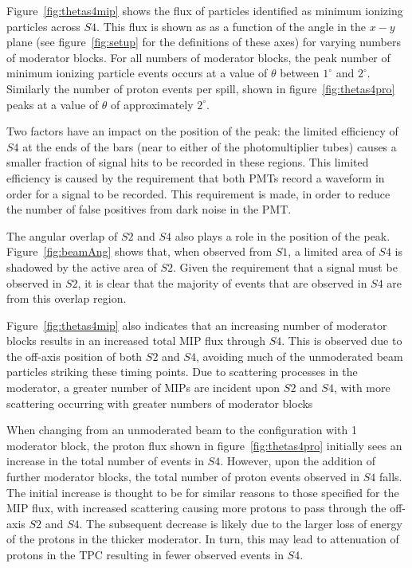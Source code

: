 	Figure~\ref{fig:thetas4mip} shows the flux of particles identified as minimum ionizing particles across $S4$.
	This flux is shown as as a function of the angle in the $x-y$ plane (see figure~\ref{fig:setup} for the definitions of these axes) for varying numbers of moderator blocks.
	For all numbers of moderator blocks, the peak number of minimum ionizing particle events occurs at a value of $\theta$ between $1^{\circ}$ and $2^{\circ}$.
	Similarly the number of proton events per spill, shown in figure~\ref{fig:thetas4pro} peaks at a value of $\theta$ of approximately $2^{\circ}$.
	
	Two factors have an impact on the position of the peak:
	the limited efficiency of $S4$ at the ends of the bars (near to either of the photomultiplier tubes) causes a smaller fraction of signal hits to be recorded in these regions. 
	This limited efficiency is caused by the requirement that both PMTs record a waveform in order for a signal to be recorded.
	This requirement is made, in order to reduce the number of false positives from dark noise in the PMT.
	
	The angular overlap of $S2$ and $S4$ also plays a role in the position of the peak. 
	Figure~\ref{fig:beamAng} shows that, when observed from $S1$, a limited area of $S4$ is shadowed by the active area of $S2$.
	Given the requirement that a signal must be observed in $S2$, it is clear that the majority of events that are observed in $S4$ are from this overlap region.
   
   	Figure~\ref{fig:thetas4mip} also indicates that an increasing number of moderator blocks results in an increased total MIP flux through $S4$.
   	This is observed due to the off-axis position of both $S2$ and $S4$, avoiding much of the unmoderated beam particles striking these timing points.
   	Due to scattering processes in the moderator, a greater number of MIPs are incident upon $S2$ and $S4$, with more scattering occurring with greater numbers of moderator blocks
   	
   	When changing from an unmoderated beam to the configuration with 1 moderator block, the proton flux shown in figure~\ref{fig:thetas4pro} initially sees an increase in the total number of events in $S4$.
   	However, upon the addition of further moderator blocks, the total number of proton events observed in $S4$ falls.
   	The initial increase is thought to be for similar reasons to those specified for the MIP flux, with increased scattering causing more protons to pass through the off-axis $S2$ and $S4$.
   	The subsequent decrease is likely due to the larger loss of energy of the protons in the thicker moderator.
   	In turn, this may lead to attenuation of protons in the TPC resulting in fewer observed events in $S4$.
   

